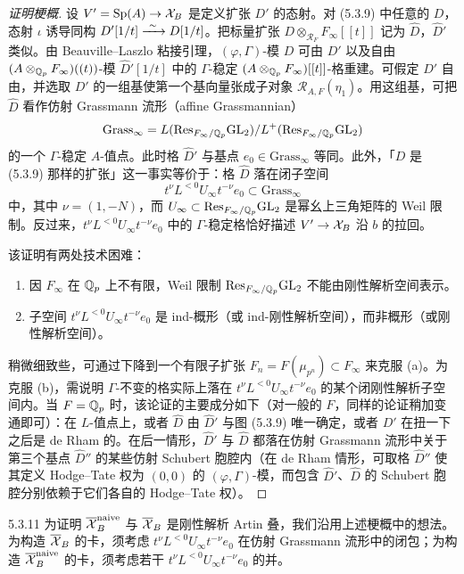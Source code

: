 \begin{proof}[证明梗概]
设 $V'=\mathrm{Sp}(A)\to\mathcal{X}_B$ 是定义扩张 $D'$ 的态射。对 (5.3.9) 中任意的 $D$，态射 $\iota$ 诱导同构 $D'[1/t]\xrightarrow{\ \sim\ } D[1/t]$。把标量扩张 $D\otimes_{\mathcal R_F}F_\infty[[t]]$ 记为 $\hat D$，$\hat D'$ 类似。由 Beauville–Laszlo 粘接引理，$(\varphi,\Gamma)$-模 $D$ 可由 $D'$ 以及自由 $(A\otimes_{\mathbb{Q}_p}F_\infty)((t))$-模 $\hat D'[1/t]$ 中的 $\Gamma$-稳定 $(A\otimes_{\mathbb{Q}_p}F_\infty)[[t]]$-格重建。可假定 $D'$ 自由，并选取 $D'$ 的一组基使第一个基向量张成子对象 $\mathcal R_{A,F}(\eta_1)$。用这组基，可把 $\hat D$ 看作仿射 Grassmann 流形（affine Grassmannian）
\[
\mathrm{Grass}_\infty=L(\mathrm{Res}_{F_\infty/\mathbb{Q}_p}\mathrm{GL}_2)/L^{+}(\mathrm{Res}_{F_\infty/\mathbb{Q}_p}\mathrm{GL}_2)
\]
的一个 $\Gamma$-稳定 $A$-值点。此时格 $\hat D'$ 与基点 $e_0\in\mathrm{Grass}_\infty$ 等同。此外，「$D$ 是 (5.3.9) 那样的扩张」这一事实等价于：格 $\hat D$ 落在闭子空间
\[
t^\nu L^{<0}U_\infty t^{-\nu}e_0\subset\mathrm{Grass}_\infty
\]
中，其中 $\nu=(1,-N)$，而 $U_\infty\subset\mathrm{Res}_{F_\infty/\mathbb{Q}_p}\mathrm{GL}_2$ 是幂幺上三角矩阵的 Weil 限制。反过来，$t^\nu L^{<0}U_\infty t^{-\nu}e_0$ 中的 $\Gamma$-稳定格恰好描述 $V'\to\mathcal{X}_B$ 沿 $b$ 的拉回。

该证明有两处技术困难：
\begin{enumerate}[label=(\alph*),leftmargin=2.2em,itemsep=0.1em]
\item 因 $F_\infty$ 在 $\mathbb{Q}_p$ 上不有限，Weil 限制 $\mathrm{Res}_{F_\infty/\mathbb{Q}_p}\mathrm{GL}_2$ 不能由刚性解析空间表示。
\item 子空间 $t^\nu L^{<0}U_\infty t^{-\nu}e_0$ 是 ind-概形（或 ind-刚性解析空间），而非概形（或刚性解析空间）。
\end{enumerate}
稍微细致些，可通过下降到一个有限子扩张 $F_n=F(\mu_{p^n})\subset F_\infty$ 来克服 (a)。为克服 (b)，需说明 $\Gamma$-不变的格实际上落在 $t^\nu L^{<0}U_\infty t^{-\nu}e_0$ 的某个闭刚性解析子空间内。当 $F=\mathbb{Q}_p$ 时，该论证的主要成分如下（对一般的 $F$，同样的论证稍加变通即可）：在 $L$-值点上，或者 $\hat D$ 由 $\hat D'$ 与图 (5.3.9) 唯一确定，或者 $D'$ 在扭一下之后是 de Rham 的。在后一情形，$\hat D'$ 与 $\hat D$ 都落在仿射 Grassmann 流形中关于第三个基点 $\hat D''$ 的某些仿射 Schubert 胞腔内（在 de Rham 情形，可取格 $\hat D''$ 使其定义 Hodge–Tate 权为 $(0,0)$ 的 $(\varphi,\Gamma)$-模，而包含 $\hat D'$、$\hat D$ 的 Schubert 胞腔分别依赖于它们各自的 Hodge–Tate 权）。
\end{proof}

\begin{rem}{5.3.11}\label{rem:a4-5-3-11}
为证明 $\overline{\mathcal{X}}_B^{\mathrm{naive}}$ 与 $\overline{\mathcal{X}}_B$ 是刚性解析 Artin 叠，我们沿用上述梗概中的想法。为构造 $\overline{\mathcal{X}}_B$ 的卡，须考虑 $t^\nu L^{<0}U_\infty t^{-\nu}e_0$ 在仿射 Grassmann 流形中的闭包；为构造 $\overline{\mathcal{X}}_B^{\mathrm{naive}}$ 的卡，须考虑若干 $t^\nu L^{<0}U_\infty t^{-\nu}e_0$ 的并。
\end{rem}

